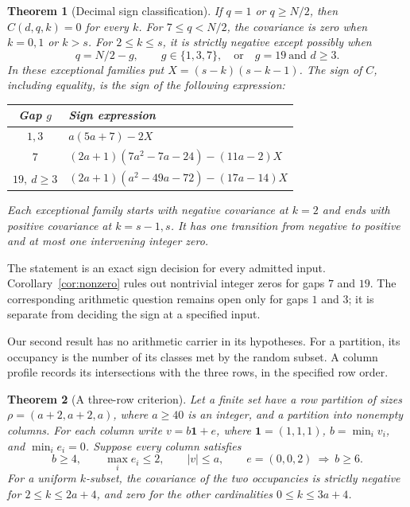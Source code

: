 \documentclass[11pt,a4paper]{article}
\newtheorem{theorem}{Theorem}
\theoremstyle{remark}
\newcommand{\one}{\mathbf 1}
\numberwithin{equation}{section}
\begin{document}
\begin{theorem}[Decimal sign classification]\label{thm:decimal}
If \(q=1\) or \(q\ge N/2\), then \(C(d,q,k)=0\) for every \(k\).
For \(7\le q<N/2\), the covariance is zero when \(k=0,1\) or \(k>s\).
For \(2\le k\le s\), it is strictly negative except possibly when
\[
 q=N/2-g,\qquad
 g\in\{1,3,7\},\quad\text{or}\quad g=19\ \text{and }d\ge3.
\]
In these exceptional families put \(X=(s-k)(s-k-1)\). The sign of \(C\),
including equality, is the sign of the following expression:
\begin{center}
\begin{tabular}{@{}cl@{}}
\toprule
Gap \(g\)&Sign expression\\
\midrule
\(1,3\)&\(a(5a+7)-2X\)\\
\(7\)&\((2a+1)(7a^2-7a-24)-(11a-2)X\)\\
\(19,\ d\ge3\)&\((2a+1)(a^2-49a-72)-(17a-14)X\)\\
\bottomrule
\end{tabular}
\end{center}
Each exceptional family starts with negative covariance at \(k=2\) and
ends with positive covariance at \(k=s-1,s\). It has one transition
from negative to positive and at most one intervening integer zero.
\end{theorem}

The statement is an exact sign decision for every admitted input.
Corollary~\ref{cor:nonzero} rules out nontrivial integer zeros for gaps
\(7\) and \(19\). The corresponding arithmetic question remains open
only for gaps \(1\) and \(3\); it is separate from deciding the sign
at a specified input.

Our second result has no arithmetic carrier in its hypotheses.
For a partition, its occupancy is the number of its classes met by the
random subset. A column profile records its intersections with the three
rows, in the specified row order.

\begin{theorem}[A three-row criterion]\label{thm:criterion}
Let a finite set have a row partition of sizes
\(\rho=(a+2,a+2,a)\), where \(a\ge40\) is an integer, and a partition
into nonempty columns. For each column write
\(v=b\one+e\), where \(\one=(1,1,1)\), \(b=\min_i v_i\), and \(\min_i e_i=0\).
Suppose every column satisfies
\begin{equation}\label{eq:criterion}
 b\ge4,\qquad \max_i e_i\le2,\qquad |v|\le a,\qquad
 e=(0,0,2)\ \Longrightarrow\ b\ge6.
\end{equation}
For a uniform \(k\)-subset, the covariance of the two occupancies is
strictly negative for \(2\le k\le2a+4\), and zero for the other
cardinalities \(0\le k\le3a+4\).
\end{theorem}
\end{document}
